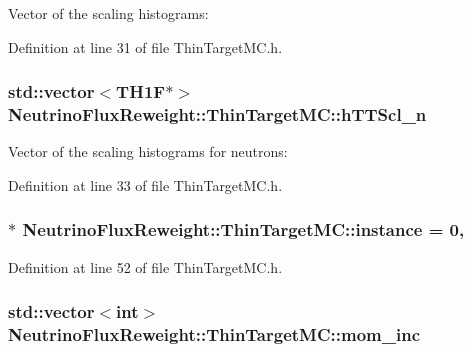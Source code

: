 Vector of the scaling histograms\-: 



Definition at line 31 of file Thin\-Target\-M\-C.\-h.

\hypertarget{class_neutrino_flux_reweight_1_1_thin_target_m_c_ad04c688c4b9d94453399329ac4fcc16d}{
\subsubsection[{h\-T\-T\-Scl\-\_\-n}]{\setlength{\rightskip}{0pt plus 5cm}std\-::vector$<$T\-H1\-F$\ast$$>$ Neutrino\-Flux\-Reweight\-::\-Thin\-Target\-M\-C\-::h\-T\-T\-Scl\-\_\-n}}\label{class_neutrino_flux_reweight_1_1_thin_target_m_c_ad04c688c4b9d94453399329ac4fcc16d}


Vector of the scaling histograms for neutrons\-: 



Definition at line 33 of file Thin\-Target\-M\-C.\-h.

\hypertarget{class_neutrino_flux_reweight_1_1_thin_target_m_c_a44231b5ccb5a2dee66a1f2ae167b33c8}{
\subsubsection[{instance}]{ $\ast$ Neutrino\-Flux\-Reweight\-::\-Thin\-Target\-M\-C\-::instance = 0\hspace{0.3cm}{\ttfamily [static]}, {\ttfamily [private]}}}\label{class_neutrino_flux_reweight_1_1_thin_target_m_c_a44231b5ccb5a2dee66a1f2ae167b33c8}


Definition at line 52 of file Thin\-Target\-M\-C.\-h.

\hypertarget{class_neutrino_flux_reweight_1_1_thin_target_m_c_a039f1c0831ba09714b7ac1c9eca47a22}{
\subsubsection[{mom\-\_\-inc}]{\setlength{\rightskip}{0pt plus 5cm}std\-::vector$<$int$>$ Neutrino\-Flux\-Reweight\-::\-Thin\-Target\-M\-C\-::mom\-\_\-inc\hspace{0.3cm}{\ttfamily [private]}}}\label{class_neutrino_flux_reweight_1_1_thin_target_m_c_a039f1c0831ba09714b7ac1c9eca47a22}


